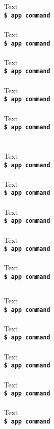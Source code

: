 \documentclass[12pt,a3paper,margin=4pt,landscape]{article}
\newcommand{\cmd}[2]{
	#1\\
	\texttt{\textbf{\$ app #2}}\\
	\\
}
\newcommand{\cmdnoline}[2]{
	#1\\
	\texttt{\textbf{\$ app #2}}
}
\newcommand{\sect}[2]{
	\section*{\color{#1}{#2}}
}
\newcommand{\subsect}[2]{
	\subsection*{\color{#1}{#2}}
}
\begin{document}
\begin{multicols}{4}

\sect{Cerulean}{Section 1}

\cmd{Text}{command}
\cmd{Text}{command}
\cmd{Text}{command}
\cmd{Text}{command}
\cmdnoline{Text}{command}

\subsect{MidnightBlue}{Subsection 1}

\sect{TealBlue}{Section 2}

\sect{NavyBlue}{Section 3}

\sect{ForestGreen}{Section 4}

\sect{ForestGreen}{Section 5}



\sect{Orange}{Section 6}

\cmd{Text}{command}
\cmd{Text}{command}
\cmd{Text}{command}
\cmd{Text}{command}
\cmdnoline{Text}{command}

\begin{adjustwidth}{0.5\columnwidth}{0pt}
\sect{BrickRed}{Section 7}
\cmd{Text}{command}
\cmd{Text}{command}
\cmd{Text}{command}
\cmd{Text}{command}
\cmdnoline{Text}{command}
\end{adjustwidth}


\end{multicols}
\end{document}
